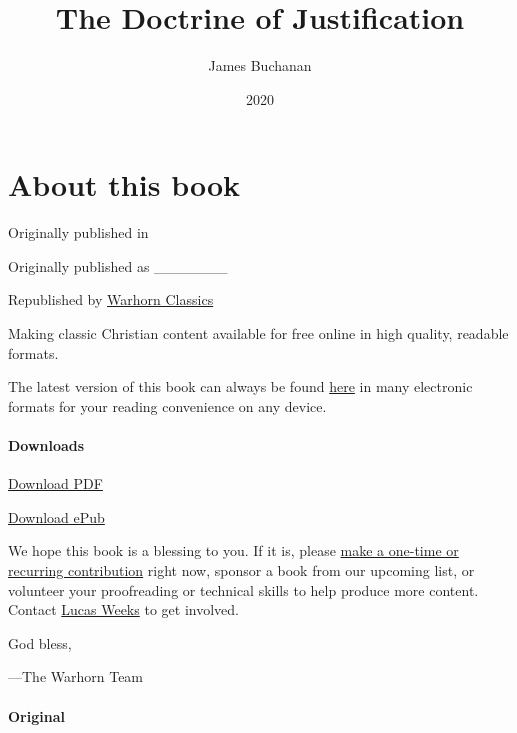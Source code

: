 \documentclass[
]{book}
\title{The Doctrine of Justification}
\author{James Buchanan}
\date{2020}
\begin{document}
\maketitle

\mainmatter
{}

{
\setcounter{tocdepth}{1}
\tableofcontents
}
\hypertarget{about-this-book}{%
\chapter*{About this book}\label{about-this-book}}

Originally published in

Originally published as \_\_\_\_\_\_\_

Republished by \href{https://classics.warhornmedia.com/}{Warhorn Classics}

Making classic Christian content available for free online in high quality, readable formats.

The latest version of this book can always be found \href{https://warhornmedia.github.io/buchanan-doctrine-of-justification/}{here} in many electronic formats for your reading convenience on any device.

\hypertarget{downloads}{%
\subsubsection*{Downloads}\label{downloads}}

\href{https://warhornmedia.github.io/buchanan-doctrine-of-justification//Buchanan-The_Doctrine_of_Justification.pdf}{Download PDF}

\href{https://warhornmedia.github.io/buchanan-doctrine-of-justification//Buchanan-The_Doctrine_of_Justification.epub}{Download ePub}

We hope this book is a blessing to you. If it is, please \href{https://warhornmedia.com/give}{make a one-time or recurring contribution} right now, sponsor a book from our upcoming list, or volunteer your proofreading or technical skills to help produce more content. Contact \href{mailto:lucas@beggarsborn.com}{Lucas Weeks} to get involved.

God bless,

---The Warhorn Team

\hypertarget{original}{%
\subsubsection*{Original}\label{original}}
\end{document}
